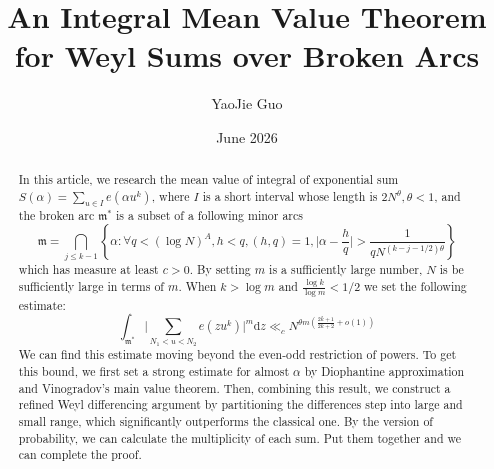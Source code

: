 \documentclass[10pt]{article}
\title{An Integral Mean Value Theorem for Weyl Sums over Broken Arcs}
\author{YaoJie Guo}
\date{June 2026}
\begin{document}
\maketitle
\begin{abstract}
In this article, we research the mean value of integral of exponential sum $S(\alpha)=\sum_{u\in I}e(\alpha u^k)$, where $I$ is a short interval whose length is $2N^{\theta},\theta<1$, and the broken arc $\mathfrak{m^*}$ is a subset of a following minor arcs
\[
\mathfrak{m}=\bigcap_{j\leq k-1}\left\{\alpha:\forall q<(\log N)^A,h<q,(h,q)=1,\Big|\alpha-\frac{h}{q}\Big|>\frac{1}{qN^{(k-j-1/2)\theta}}\right\}
\]
which has measure at least $c>0$. By setting $m$ is a sufficiently large number, $N$ is be sufficiently large in terms of $m$. When $k>\log m$ and $\frac{\log k}{\log m}<1/2$ we set the following estimate:
\[
\int_{\mathfrak{m^*}}\bigg|\sum\limits_{{N_1}<u<{N_2}}{e(zu^k)}\bigg|^{m}\mathrm{d}z\ll_cN^{\theta m(\frac{2k+1}{2k+2}+o(1))}
\]
We can find this estimate moving beyond the even-odd restriction of powers. To get this bound, we first set a strong estimate for almost $\alpha$ by Diophantine approximation and Vinogradov's main value theorem. Then, combining this result, we construct a refined Weyl differencing argument by partitioning the differences step into large and small range, which significantly outperforms the classical one. By the version of probability, we can calculate the multiplicity of each sum. Put them together and we can complete the proof.
\end{abstract}
\end{document}
